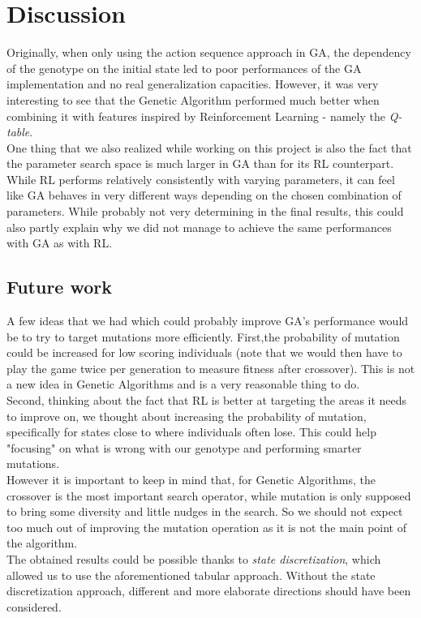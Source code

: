 \section{Discussion}
Originally, when only using the action sequence approach in GA, the dependency of the genotype on the initial state led to poor performances of the GA implementation and no real generalization capacities.
However, it was very interesting to see that the Genetic Algorithm performed much better when combining it with features inspired by Reinforcement Learning - namely the \textit{Q-table}.
\\
One thing that we also realized while working on this project is also the fact that the parameter search space is much larger in GA than for its RL counterpart. 
While RL performs relatively consistently with varying parameters, it can feel like GA behaves in very different ways depending on the chosen combination of parameters.
While probably not very determining in the final results, this could also partly explain why we did not manage to achieve the same performances with GA as with RL.
\\

\subsection{Future work}
A few ideas that we had which could probably improve GA's performance would be to try to target mutations more efficiently.
First,the probability of mutation could be increased for low scoring individuals (note that we would then have to play the game twice per generation to measure fitness after crossover).
This is not a new idea in Genetic Algorithms and is a very reasonable thing to do.
\\
Second, thinking about the fact that RL is better at targeting the areas it needs to improve on, we thought about increasing the probability of mutation, specifically for states close to where individuals often lose.
This could help "focusing" on what is wrong with our genotype and performing smarter mutations.
\\
However it is important to keep in mind that, for Genetic Algorithms, the crossover is the most important search operator, while mutation is only supposed to bring some diversity and little nudges in the search.
So we should not expect too much out of improving the mutation operation as it is not the main point of the algorithm.
\\
The obtained results could be possible thanks to \textit{state discretization}, which allowed us to use the aforementioned tabular approach.
Without the state discretization approach, different and more elaborate directions should have been considered.